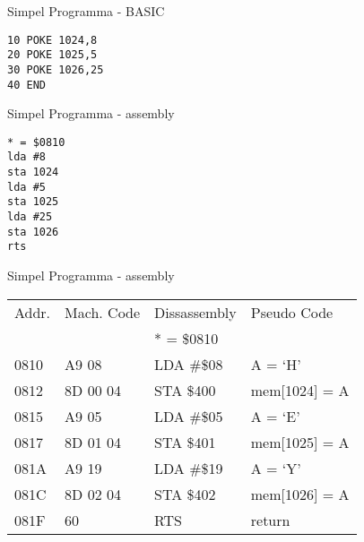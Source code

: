 \documentclass[aspectratio=43]{uva-inf-presentation}
\begin{document}

\begin{frame}[fragile]{Simpel Programma - BASIC}

\begin{lstlisting}
10 POKE 1024,8
20 POKE 1025,5
30 POKE 1026,25
40 END
\end{lstlisting}

\end{frame}


\begin{frame}[fragile]{Simpel Programma - assembly}

\begin{lstlisting}
* = $0810
lda #8
sta 1024
lda #5
sta 1025
lda #25
sta 1026
rts
\end{lstlisting}

\end{frame}


\begin{frame}{Simpel Programma - assembly}

\begin{tabular}{l|l|l|l}
Addr. & Mach. Code & Dissassembly & Pseudo Code \\
 & & * = \$0810 & \\
0810 & A9 08 & LDA \#\$08 & A = `H' \\
0812 & 8D 00 04 & STA \$400 & mem[1024] = A \\
0815 & A9 05 & LDA \#\$05 & A = `E' \\
0817 & 8D 01 04 & STA \$401 & mem[1025] = A \\
081A & A9 19 & LDA \#\$19 & A = `Y' \\
081C & 8D 02 04 & STA \$402 & mem[1026] = A \\
081F & 60 & RTS & return \\
\end{tabular}

\end{frame}







\end{document}
